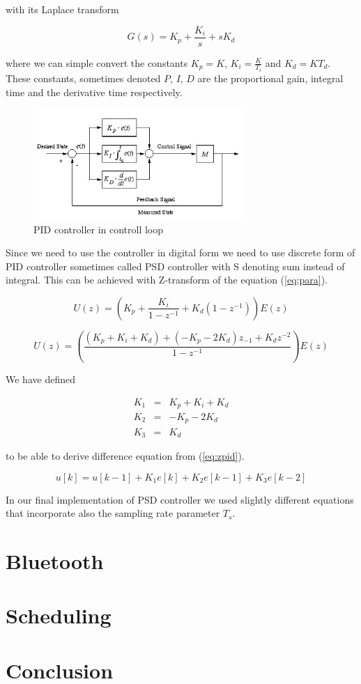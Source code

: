 \documentclass{article}
\begin{document}
\noindent with its Laplace transform

\begin{equation}
    G(s) = K_p + \frac{K_i}{s} + sK_d
\end{equation}

\noindent where we can simple convert the constants $K_p = K$, $K_i =
\frac{K}{T_i}$ and $K_d = KT_d$. These constants, sometimes denoted $P$, $I$, $D$ are the proportional gain,
integral time and the derivative time respectively.

\begin{figure}[h]
    \centering
    \includegraphics[width=8cm]{pid}
    \caption{PID controller in controll loop \cite{pidpic}}
    \label{fig:pidpic}
\end{figure}

Since we need to use the controller in digital form we need to use discrete form
of PID controller sometimes called PSD controller with S denoting sum instead of
integral. This can be achieved with Z-transform of the equation (\ref{eq:para}).
\cite{zt}

\begin{equation}
    U(z) = \left( K_p + \frac{K_i}{1-z^{-1}} + K_d\left(1-z^{-1}\right) \right)E(z)
\end{equation}

\begin{equation} \label{eq:zpid}
    U(z) = \left( \frac{\left( K_p + K_i + K_d\right) + \left(
    -K_p-2K_d\right)z_{-1} + K_dz^{-2}}{1-z^{-1}} \right)E(z)
\end{equation}

\noindent We have defined

\begin{eqnarray*}
    K_1 &=& K_p + K_i + K_d \\
    K_2 &=& -K_p-2K_d \\
    K_3 &=& K_d
\end{eqnarray*}

\noindent to be able to derive difference equation from (\ref{eq:zpid}).

\begin{equation}
    u[k] = u[k-1] + K_1e[k]+K_2e[k-1]+K_3e[k-2]
\end{equation}

In our final implementation of PSD controller we used slightly different
equations that incorporate also the sampling rate parameter $T_s$.

\section{Bluetooth}

\section{Scheduling}

\section{Conclusion}

\printbibliography
\end{document}
